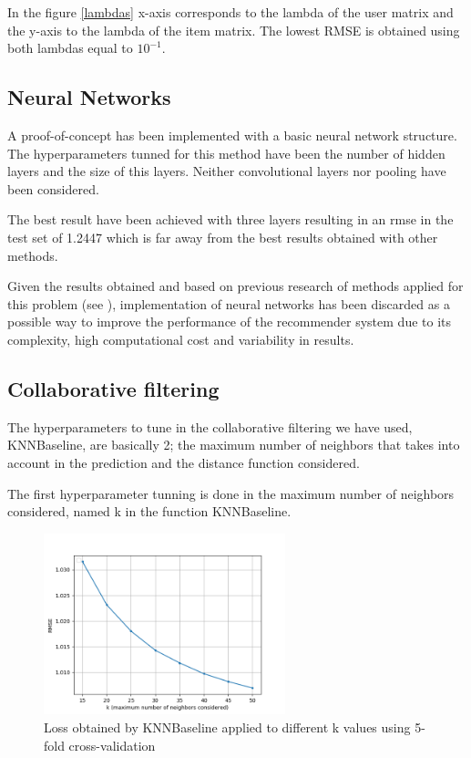 \documentclass[11pt,conference]{IEEEtran}
\begin{document}
In the figure \ref{lambdas} x-axis corresponds to the lambda of the user matrix and the y-axis to the lambda of the item matrix. The lowest RMSE is obtained using both lambdas equal to $10^{-1}$.

\subsection{Neural Networks}
A proof-of-concept has been implemented with a basic neural network structure. The hyperparameters tunned for this method have been the number of hidden layers and the size of this layers. Neither convolutional layers nor pooling have been considered. 

The best result have been achieved with three layers resulting in an rmse in the test set of 1.2447 which is far away from the best results obtained with other methods. 

Given the results obtained and based on previous research of methods applied for this problem (see \cite{Recommender Systems}), implementation of neural networks has been discarded as a possible way to improve the performance of the recommender system due to its complexity, high computational cost and variability in results. 


\subsection{Collaborative filtering}
The hyperparameters to tune in the collaborative filtering we have used, KNNBaseline, are basically 2; the maximum number of neighbors that takes into account in the prediction and the distance function considered. 

The first hyperparameter tunning is done in the maximum number of neighbors considered, named k in the function KNNBaseline. 

\begin{figure}[ht!]
	\centering
	\includegraphics[width=265px]{k.png}
	\caption{Loss obtained by KNNBaseline applied to different k values using 5-fold cross-validation}
    \label{KNN1}
\end{figure}
\end{document}
